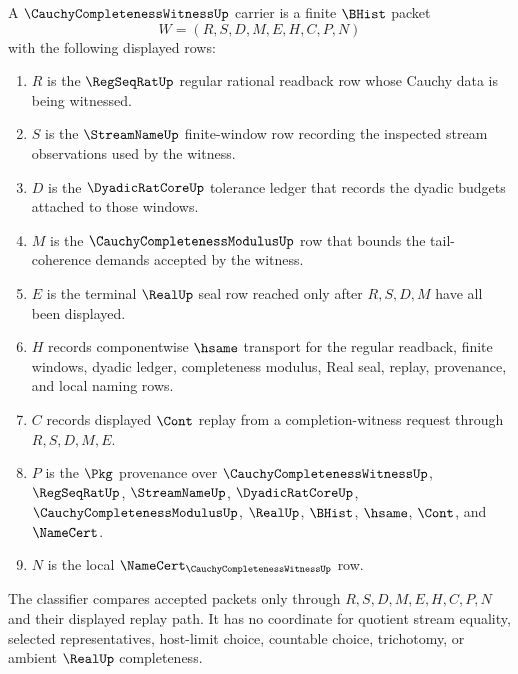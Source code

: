 \begin{definition}
\label{def:cauchy-completeness-witness-carrier}
A $\CauchyCompletenessWitnessUp$ carrier is a finite $\BHist$ packet
$$
W=(R,S,D,M,E,H,C,P,N)
$$
with the following displayed rows:
\begin{enumerate}
\item $R$ is the $\RegSeqRatUp$ regular rational readback row whose Cauchy data is being witnessed.
\item $S$ is the $\StreamNameUp$ finite-window row recording the inspected stream observations used by the witness.
\item $D$ is the $\DyadicRatCoreUp$ tolerance ledger that records the dyadic budgets attached to those windows.
\item $M$ is the $\CauchyCompletenessModulusUp$ row that bounds the tail-coherence demands accepted by the witness.
\item $E$ is the terminal $\RealUp$ seal row reached only after $R,S,D,M$ have all been displayed.
\item $H$ records componentwise $\hsame$ transport for the regular readback, finite windows, dyadic ledger, completeness modulus, Real seal, replay, provenance, and local naming rows.
\item $C$ records displayed $\Cont$ replay from a completion-witness request through $R,S,D,M,E$.
\item $P$ is the $\Pkg$ provenance over $\CauchyCompletenessWitnessUp$, $\RegSeqRatUp$, $\StreamNameUp$, $\DyadicRatCoreUp$, $\CauchyCompletenessModulusUp$, $\RealUp$, $\BHist$, $\hsame$, $\Cont$, and $\NameCert$.
\item $N$ is the local $\NameCert_{\CauchyCompletenessWitnessUp}$ row.
\end{enumerate}
The classifier compares accepted packets only through $R,S,D,M,E,H,C,P,N$ and their displayed replay path. It has no coordinate for quotient stream equality, selected representatives, host-limit choice, countable choice, trichotomy, or ambient $\RealUp$ completeness.
\end{definition}

